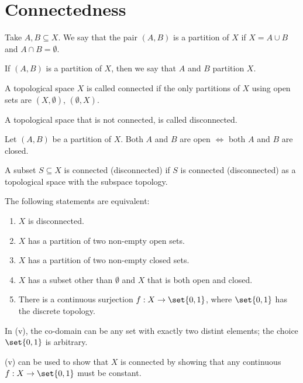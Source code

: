 \section{Connectedness}
\begin{ndfn}[Partition]
  Take $A, B \subseteq X$. We say that the pair $(A,B)$ is a partition of $X$ if $X = A \cup B$ and $A \cap B = \emptyset$.
\end{ndfn}
If $(A,B)$ is a partition of $X$, then we say that $A$ and $B$ partition $X$.

\begin{ndfn}[Connected]
  A topological space $X$ is called connected if the only partitions of $X$ using open sets are $(X, \emptyset)$, $(\emptyset, X)$.
\end{ndfn}
A topological space that is not connected, is called disconnected.

\begin{remark}
  Let $(A,B)$ be a partition of $X$. Both $A$ and $B$ are open $\iff$ both $A$ and $B$ are closed.
\end{remark}

\begin{ndfn}
  A subset $S \subseteq X$ is connected (disconnected) if $S$ is connected (disconnected) as a topological space with the subspace topology.
\end{ndfn}

\begin{nthm}
  The following statements are equivalent:
  \begin{enumerate}
  \item $X$ is disconnected.
  \item $X$ has a partition of two non-empty open sets.
  \item $X$ has a partition of two non-empty closed sets.
  \item $X$ has a subset other than $\emptyset$ and $X$ that is both open and closed.
  \item There is a continuous surjection $f: X \to \set{0,1}$, where $\set{0,1}$ has the discrete topology.
  \end{enumerate}
\end{nthm}

In (v), the co-domain can be any set with exactly two distint elements; the choice $\set{0,1}$ is arbitrary.

(v) can be used to show that $X$ is connected by showing that any continuous $f: X \to \set{0,1}$ must be constant.

